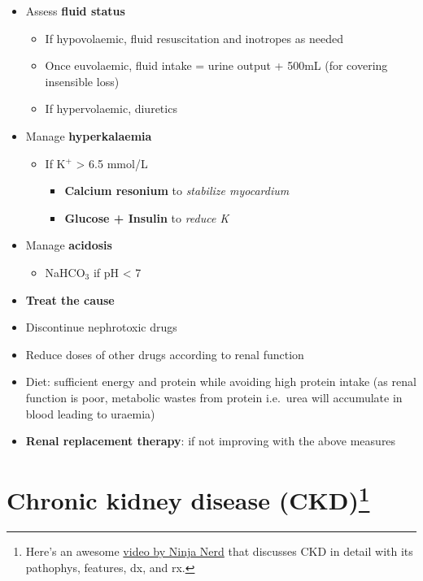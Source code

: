 \documentclass[
  12pt,
]{memoir}
\providecommand{\tightlist}{%
  \setlength{\itemsep}{0pt}\setlength{\parskip}{0pt}}
\begin{document}
\begin{itemize}
\tightlist
\item
  Assess \textbf{fluid status}

  \begin{itemize}
  \tightlist
  \item
    If hypovolaemic, fluid resuscitation and inotropes as needed
  \item
    Once euvolaemic, fluid intake = urine output + 500mL (for covering
    insensible loss)
  \item
    If hypervolaemic, diuretics
  \end{itemize}
\item
  Manage \textbf{hyperkalaemia}

  \begin{itemize}
  \tightlist
  \item
    If K\(^+\) \textgreater{} 6.5 mmol/L

    \begin{itemize}
    \tightlist
    \item
      \textbf{Calcium resonium} to \emph{stabilize myocardium}
    \item
      \textbf{Glucose + Insulin} to \emph{reduce K}
    \end{itemize}
  \end{itemize}
\item
  Manage \textbf{acidosis}

  \begin{itemize}
  \tightlist
  \item
    NaHCO\(_3\) if pH \textless{} 7
  \end{itemize}
\item
  \textbf{Treat the cause}
\item
  Discontinue nephrotoxic drugs
\item
  Reduce doses of other drugs according to renal function
\item
  Diet: sufficient energy and protein while avoiding high protein intake
  (as renal function is poor, metabolic wastes from protein i.e.~urea
  will accumulate in blood leading to uraemia)
\item
  \textbf{Renal replacement therapy}: if not improving with the above
  measures
\end{itemize}

\pagebreak

\section [Chronic kidney disease (CKD)]
{Chronic kidney disease (CKD)\footnote{
Here's an awesome
 \href{https://www.youtube.com/watch?v=iyMw-b3Ypzw&list=TLPQMTQwNzIwMjJ11biDo7N03Q&index=15}{video by Ninja Nerd}
 that discusses CKD in detail with its
 pathophys, features, dx, and rx.}}
\end{document}
